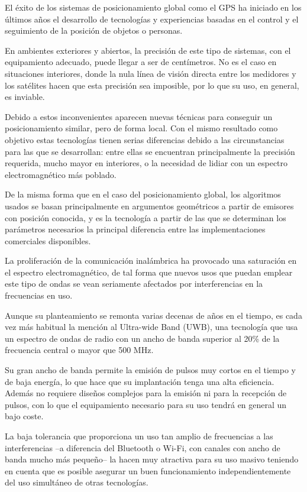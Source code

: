 El éxito de los sistemas de posicionamiento global como el GPS ha iniciado en los últimos años el desarrollo de tecnologías y experiencias basadas en el control y el seguimiento de la posición de objetos o personas.

En ambientes exteriores y abiertos, la precisión de este tipo de sistemas, con el equipamiento adecuado, puede llegar a ser de centímetros.
No es el caso en situaciones interiores, donde la nula línea de visión directa entre los medidores y los satélites hacen que esta precisión sea imposible, por lo que su uso, en general, es inviable.

Debido a estos inconvenientes aparecen nuevas técnicas para conseguir un posicionamiento similar, pero de forma local.
Con el mismo resultado como objetivo estas tecnologías tienen serias diferencias debido a las circunstancias para las que se desarrollan: entre ellas se encuentran principalmente la precisión requerida, mucho mayor en interiores, o la necesidad de lidiar con un espectro electromagnético más poblado.

De la misma forma que en el caso del posicionamiento global, los algoritmos usados se basan principalmente en argumentos geométricos a partir de emisores con posición conocida, y es la tecnología a partir de las que se determinan los parámetros necesarios la principal diferencia entre las implementaciones comerciales disponibles.

La proliferación de la comunicación inalámbrica ha provocado una saturación en el espectro electromagnético, de tal forma que nuevos usos que puedan emplear este tipo de ondas se vean seriamente afectados por interferencias en la frecuencias en uso.

Aunque su planteamiento se remonta varias decenas de años en el tiempo, es cada vez más habitual la mención al Ultra-wide Band (UWB), una tecnología que usa un espectro de ondas de radio con un ancho de banda superior al 20\% de la frecuencia central o mayor que 500 MHz.

Su gran ancho de banda permite la emisión de pulsos muy cortos en el tiempo y de baja energía, lo que hace que su implantación tenga una alta eficiencia.
Además no requiere diseños complejos para la emisión ni para la recepción de pulsos, con lo que el equipamiento necesario para su uso tendrá en general un bajo coste.

La baja tolerancia que proporciona un uso tan amplio de frecuencias a las interferencias --a diferencia del Bluetooth o Wi-Fi, con canales con ancho de banda mucho más pequeño-- la hacen muy atractiva para su uso masivo teniendo en cuenta que es posible asegurar un buen funcionamiento independientemente del uso simultáneo de otras tecnologías.

